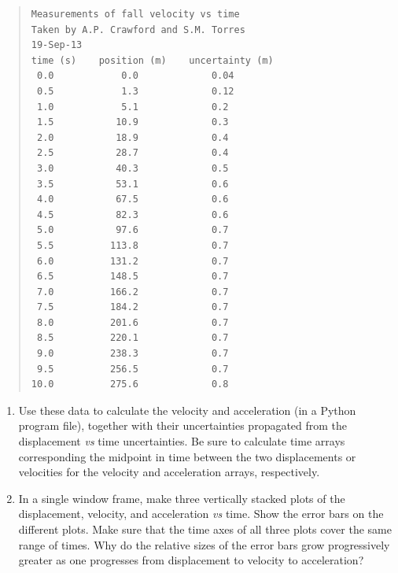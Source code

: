 \documentclass[letterpaper,10pt,english]{sphinxmanual}
\begin{document}
\begin{enumerate}
\begin{quote}
\begin{Verbatim}[commandchars=\\\{\}]
Measurements of fall velocity vs time
Taken by A.P. Crawford and S.M. Torres
19-Sep-13
time (s)    position (m)    uncertainty (m)
 0.0            0.0             0.04
 0.5            1.3             0.12
 1.0            5.1             0.2
 1.5           10.9             0.3
 2.0           18.9             0.4
 2.5           28.7             0.4
 3.0           40.3             0.5
 3.5           53.1             0.6
 4.0           67.5             0.6
 4.5           82.3             0.6
 5.0           97.6             0.7
 5.5          113.8             0.7
 6.0          131.2             0.7
 6.5          148.5             0.7
 7.0          166.2             0.7
 7.5          184.2             0.7
 8.0          201.6             0.7
 8.5          220.1             0.7
 9.0          238.3             0.7
 9.5          256.5             0.7
10.0          275.6             0.8
\end{Verbatim}
\end{quote}
\begin{enumerate}
\item {} 
Use these data to calculate the velocity and acceleration (in a Python program  file), together with their uncertainties propagated from the displacement \emph{vs} time uncertainties.  Be sure to calculate time arrays corresponding the midpoint in time between the two displacements or velocities for the velocity and acceleration arrays, respectively.

\item {} 
In a single window frame, make three vertically stacked plots of the displacement, velocity, and acceleration \emph{vs} time.  Show the error bars on the different plots.  Make sure that the time axes of all three plots cover the same range of times. Why do the relative sizes of the error bars grow progressively greater as one progresses from displacement to velocity to acceleration?

\end{enumerate}

\end{enumerate}
\end{document}
